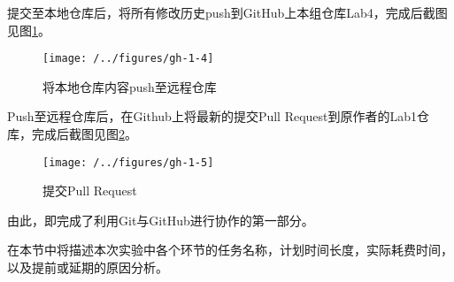 提交至本地仓库后，将所有修改历史push到GitHub上本组仓库Lab4，完成后截图见图\ref{fig:gh-1-4}。

\begin{figure}
\centering
\texttt{[image: /../figures/gh-1-4]}
\caption{将本地仓库内容push至远程仓库}
\label{fig:gh-1-4}
\end{figure}

Push至远程仓库后，在Github上将最新的提交Pull Request到原作者的Lab1仓库，完成后截图见图\ref{fig:gh-1-5}。

\begin{figure}
\centering
\texttt{[image: /../figures/gh-1-5]}
\caption{提交Pull Request}
\label{fig:gh-1-5}
\end{figure}

由此，即完成了利用Git与GitHub进行协作的第一部分。



在本节中将描述本次实验中各个环节的任务名称，计划时间长度，实际耗费时间，以及提前或延期的原因分析。



